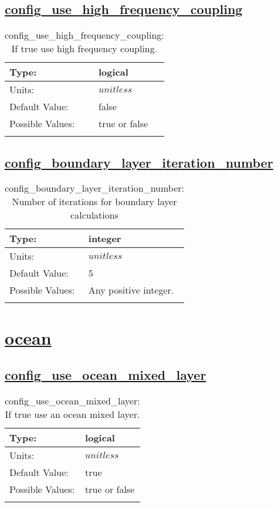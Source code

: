 \subsection[config\_use\_high\_frequency\_coupling]{\hyperref[sec:nm_tab_atmosphere]{config\_use\_high\_frequency\_coupling}}
\label{subsec:nm_sec_config_use_high_frequency_coupling}
\begin{center}
\begin{longtable}{| p{2.0in} || p{4.0in} |}
    \hline
    Type: & logical \\
    \hline
    Units: & $unitless$ \\
    \hline
    Default Value: & false \\
    \hline
    Possible Values: & true or false \\
    \hline
    \caption{config\_use\_high\_frequency\_coupling: If true use high frequency coupling.}
\end{longtable}
\end{center}
\subsection[config\_boundary\_layer\_iteration\_number]{\hyperref[sec:nm_tab_atmosphere]{config\_boundary\_layer\_iteration\_number}}
\label{subsec:nm_sec_config_boundary_layer_iteration_number}
\begin{center}
\begin{longtable}{| p{2.0in} || p{4.0in} |}
    \hline
    Type: & integer \\
    \hline
    Units: & $unitless$ \\
    \hline
    Default Value: & 5 \\
    \hline
    Possible Values: & Any positive integer. \\
    \hline
    \caption{config\_boundary\_layer\_iteration\_number: Number of iterations for boundary layer calculations}
\end{longtable}
\end{center}
\section[ocean]{\hyperref[sec:nm_tab_ocean]{ocean}}
\label{sec:nm_sec_ocean}
\subsection[config\_use\_ocean\_mixed\_layer]{\hyperref[sec:nm_tab_ocean]{config\_use\_ocean\_mixed\_layer}}
\label{subsec:nm_sec_config_use_ocean_mixed_layer}
\begin{center}
\begin{longtable}{| p{2.0in} || p{4.0in} |}
    \hline
    Type: & logical \\
    \hline
    Units: & $unitless$ \\
    \hline
    Default Value: & true \\
    \hline
    Possible Values: & true or false \\
    \hline
    \caption{config\_use\_ocean\_mixed\_layer: If true use an ocean mixed layer.}
\end{longtable}
\end{center}
